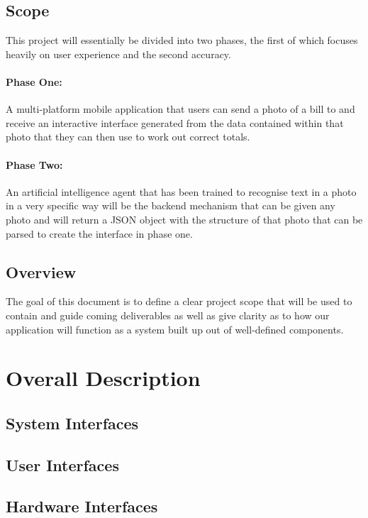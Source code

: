 \documentclass[12pt,a4paper]{article}
\begin{document}
   	\subsection{Scope}	
   	This project will essentially be divided into two phases, the first of which focuses heavily on user experience and the second accuracy.
		\paragraph{Phase One:}
		A multi-platform mobile application that users can send a photo of a bill to and receive an interactive interface generated from the data contained within that photo that they can then use to work out correct totals.
		\paragraph{Phase Two:}
		An artificial intelligence agent that has been trained to recognise text in a photo in a very specific way will be the backend mechanism that can be given any photo and will return a JSON object with the structure of that photo that can be parsed to create the interface in phase one. 
		
   	\subsection{Overview}
The goal of this document is to define a clear project scope that will be used to contain and guide coming deliverables as well as give clarity as to how our application will function as a system built up out of well-defined components.

   \section{Overall Description}
   	\subsection{System Interfaces}
   	
   	\subsection{User Interfaces}
   		
   	\subsection{Hardware Interfaces}
   	
\end{document}
